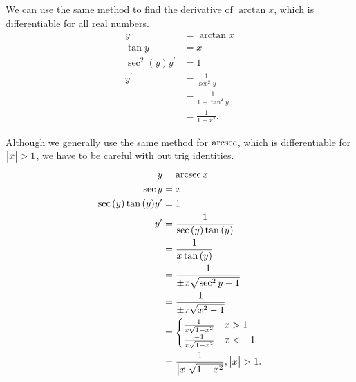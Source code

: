 We can use the same method to find the derivative of $\arctan{x}$, which is differentiable for all real numbers.
\begin{align*}
	y &= \arctan{x} \\
	\tan{y} &= x \\
	\sec^2{(y)}y^\prime &= 1 \\
	y^\prime &= \frac{1}{\sec^2{y}} \\
	&= \frac{1}{1+\tan^2{y}} \\
	&= \frac{1}{1+x^2}.
\end{align*}


Although we generally use the same method for $\operatorname{arcsec}$, which is differentiable for $\big\lvert x \big\rvert>1$, we have to be careful with out trig identities.
\begin{align*}
	y &= \operatorname{arcsec}{x} \\
	\sec{y} &= x \\
	\sec{(y)}\tan{(y)}y^\prime &= 1 \\
	y^\prime &= \frac{1}{\sec{(y)}\tan{(y)}} \\
	&= \frac{1}{x\tan{(y)}} \\
	&= \frac{1}{\pm x\sqrt{\sec^2{y}-1}} \\
	&= \frac{1}{\pm x\sqrt{x^2-1}} \\
	&= \begin{cases}
		\frac{1}{x\sqrt{1-x^2}} & x > 1 \\
		\frac{-1}{x\sqrt{1-x^2}} & x < -1
	\end{cases} \\
	&= \frac{1}{\big\lvert x \big\rvert\sqrt{1-x^2}}, \big\lvert x \big\rvert > 1.
\end{align*}

